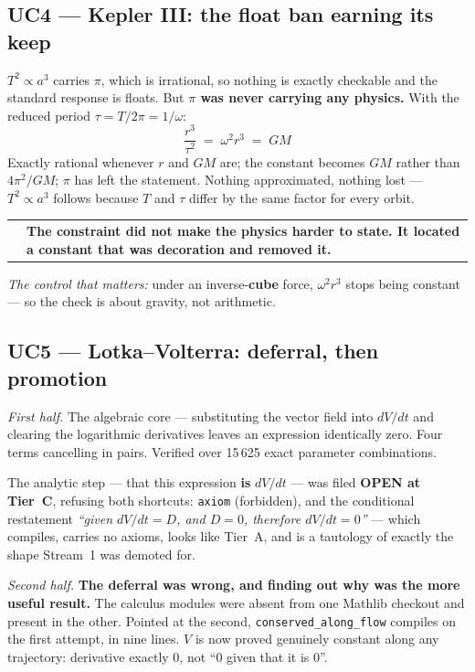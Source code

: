 \documentclass[11pt,a4paper]{article}
\makeatletter
\newcommand{\caveat}[1]{%
  \par\vspace{0.6em}\noindent
  \begin{tabular}{@{}p{0.4em}@{\hspace{0.8em}}p{\dimexpr\linewidth-2.2em\relax}@{}}
  \textcolor{rulegray}{\rule{2pt}{\baselineskip}} & \small #1
  \end{tabular}\par\vspace{0.6em}}
\makeatother
\begin{document}
\subsection{UC4 — Kepler III: the float ban earning its keep}

$T^2 \propto a^3$ carries $\pi$, which is irrational, so nothing is exactly checkable and the
standard response is floats. But \textbf{$\pi$ was never carrying any physics.} With the reduced
period $\tau = T/2\pi = 1/\omega$:
\[
  \frac{r^3}{\tau^2} \;=\; \omega^2 r^3 \;=\; GM
\]
Exactly rational whenever $r$ and $GM$ are; the constant becomes $GM$ rather than $4\pi^2/GM$;
$\pi$ has left the statement. Nothing approximated, nothing lost — $T^2 \propto a^3$ follows
because $T$ and $\tau$ differ by the same factor for every orbit.

\caveat{\textbf{The constraint did not make the physics harder to state. It located a constant
that was decoration and removed it.}}

\emph{The control that matters:} under an inverse-\textbf{cube} force, $\omega^2 r^3$ stops being
constant — so the check is about gravity, not arithmetic.

\subsection{UC5 — Lotka–Volterra: deferral, then promotion}

\emph{First half.} The algebraic core — substituting the vector field into $dV/dt$ and clearing
the logarithmic derivatives leaves an expression identically zero. Four terms cancelling in
pairs. Verified over 15\,625 exact parameter combinations.

The analytic step — that this expression \textbf{is} $dV/dt$ — was filed \textbf{OPEN at Tier~C},
refusing both shortcuts: \texttt{axiom} (forbidden), and the conditional restatement
\emph{``given $dV/dt = D$, and $D = 0$, therefore $dV/dt = 0$''} — which compiles, carries no
axioms, looks like Tier~A, and is a tautology of exactly the shape Stream~1 was demoted for.

\emph{Second half.} \textbf{The deferral was wrong, and finding out why was the more useful
result.} The calculus modules were absent from one Mathlib checkout and present in the other.
Pointed at the second, \texttt{conserved_along_flow} compiles on the first attempt, in nine
lines. $V$ is now proved genuinely constant along any trajectory: derivative exactly $0$, not
``$0$ given that it is $0$''.
\end{document}
